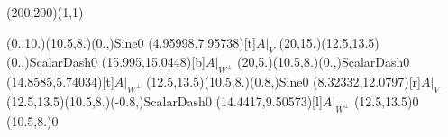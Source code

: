 \unitlength=1bp%

\begin{feynartspicture}(200,200)(1,1)

\FADiagram{}
\FAProp(0.,10.)(10.5,8.)(0.,){Sine}{0}
\FALabel(4.95998,7.95738)[t]{$A|_V$}
\FAProp(20,15.)(12.5,13.5)(0.,){ScalarDash}{0}
\FALabel(15.995,15.0448)[b]{$A|_{W^\perp}$}
\FAProp(20,5.)(10.5,8.)(0.,){ScalarDash}{0}
\FALabel(14.8585,5.74034)[t]{$A|_{W^\perp}$}
\FAProp(12.5,13.5)(10.5,8.)(0.8,){Sine}{0}
\FALabel(8.32332,12.0797)[r]{$A|_V$}
\FAProp(12.5,13.5)(10.5,8.)(-0.8,){ScalarDash}{0}
\FALabel(14.4417,9.50573)[l]{$A|_{W^\perp}$}
\FAVert(12.5,13.5){0}
\FAVert(10.5,8.){0}
\end{feynartspicture}

